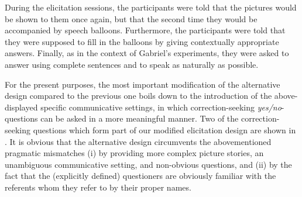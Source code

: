 \documentclass[output=paper]{langsci/langscibook}
\begin{document}
During the elicitation sessions, the participants were told that the pictures would be shown to them once again, but that the second time they would be accompanied by speech balloons. Furthermore, the participants were told that they were supposed to fill in the balloons by giving contextually appropriate answers. Finally, as in the context of Gabriel’s \citeyearpar{Gabriel2007,Gabriel2010article} experiments, they were asked to answer using complete sentences and to speak as naturally as possible.

For the present purposes, the most important modification of the alternative design compared to the previous one boils down to the introduction of the above-displayed specific communicative settings, in which correction-seeking \textit{yes/no}-questions can be asked in a more meaningful manner. Two of the correction-seeking questions which form part of our modified elicitation design are shown in . It is obvious that the alternative design circumvents the abovementioned pragmatic mismatches (i) by providing more complex picture stories, an unambiguous communicative setting, and non-obvious questions, and (ii) by the fact that the (explicitly defined) questioners are obviously familiar with the referents whom they refer to by their proper names.
\end{document}
